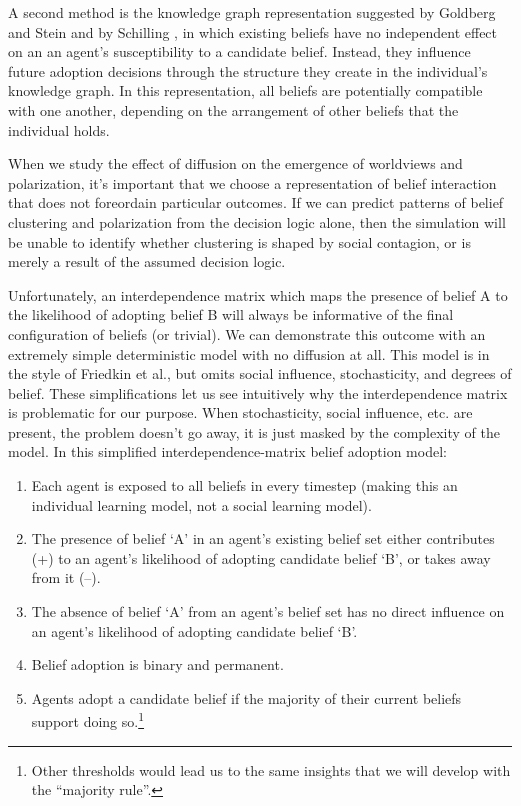 \documentclass{article}
\begin{document}
A second method is the knowledge graph representation suggested by Goldberg and Stein \cite{goldberg2018beyond} and by Schilling \cite{schilling2005small}, in which existing beliefs have no independent effect on an an agent's susceptibility to a candidate belief. Instead, they influence future adoption decisions through the structure they create in the individual's knowledge graph. In this representation, all beliefs are potentially compatible with one another, depending on the arrangement of other beliefs that the individual holds.

When we study the effect of diffusion on the emergence of worldviews and polarization, it's important that we choose a representation of belief interaction that does not foreordain particular outcomes. If we can predict patterns of belief clustering and polarization from the decision logic alone, then the simulation will be unable to identify whether clustering is shaped by social contagion, or is merely a result of the assumed decision logic.

Unfortunately, an interdependence matrix which maps the presence of belief A to the likelihood of adopting belief B will always be informative of the final configuration of beliefs (or trivial). We can demonstrate this outcome with an extremely simple deterministic model with no diffusion at all. This model is in the style of Friedkin et al.\cite{friedkin2016network}, but omits social influence, stochasticity, and degrees of belief. These simplifications let us see intuitively why the interdependence matrix is problematic for our purpose. When stochasticity, social influence, etc. are present, the problem doesn't go away, it is just masked by the complexity of the model. In this simplified interdependence-matrix belief adoption model:

\begin{enumerate}
    \item Each agent is exposed to all beliefs in every timestep (making this an individual learning model, not a social learning model).
    \item The presence of belief ‘A’ in an agent's existing belief set either contributes (+) to an agent's likelihood of adopting candidate belief ‘B’, or takes away from it (–).
    \item The absence of belief ‘A’ from an agent's belief set has no direct influence on an agent's likelihood of adopting candidate belief ‘B’.
    \item Belief adoption is binary and permanent.
    \item Agents adopt a candidate belief if the majority of their current beliefs support doing so.\footnote{Other thresholds would lead us to the same insights that we will develop with the ``majority rule''.}
\end{enumerate}
\end{document}
